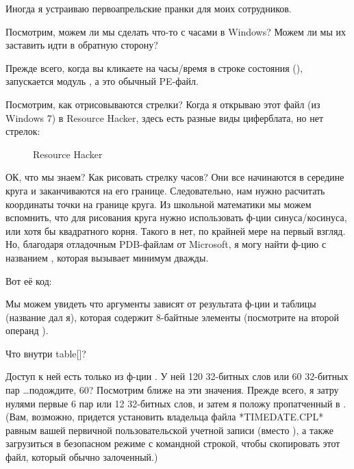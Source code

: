 
Иногда я устраиваю первоапрельские пранки для моих сотрудников.

Посмотрим, можем ли мы сделать что-то с часами в Windows?
Можем ли мы их заставить идти в обратную сторону?

Прежде всего, когда вы кликаете на часы/время в строке состояния (),\\
запускается модуль ,
а это обычный \ac{PE}-файл.

Посмотрим, как отрисовываются стрелки?
Когда я открываю этот файл (из Windows 7) в Resource Hacker, здесь есть разные виды циферблата, но нет стрелок:

\begin{figure}[H]
\centering
{}
\caption{Resource Hacker}
\end{figure}

ОК, что мы знаем? Как рисовать стрелку часов? Они все начинаются в середине круга и заканчиваются на его границе.
Следовательно, нам нужно расчитать координаты точки на границе круга.
Из школьной математики мы можем вспомнить, что для рисования круга нужно использовать ф-ции синуса/косинуса, или
хотя бы квадратного корня.
Такого в  нет, по крайней мере на первый взгляд.
Но, благодаря отладочным PDB-файлам от Microsoft, я могу найти ф-цию с названием , которая
вызывает  минимум дважды.

Вот её код:



Мы можем увидеть что аргументы  зависят от результата ф-ции 
и таблицы  (название дал я),
которая содержит 8-байтные элементы (посмотрите на второй операнд ).

Что внутри table[]?



Доступ к ней есть только из ф-ции .
У ней 120 32-битных слов или 60 32-битных пар \dots подождите, 60?
Посмотрим ближе на эти значения.
Прежде всего, я затру нулями первые 6 пар или 12 32-битных слов, и затем я положу пропатченный 
в .
(Вам, возможно, придется установить владельца файла *TIMEDATE.CPL* равным вашей первичной пользовательской учетной
записи (вместо ),
а также загрузиться в безопасном режиме с командной строкой, чтобы скопировать этот файл, который обычно залоченный.)

